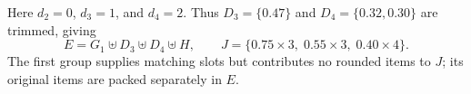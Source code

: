 Here $d_2=0$, $d_3=1$, and $d_4=2$. Thus
$D_3=\{0.47\}$ and $D_4=\{0.32,0.30\}$ are trimmed, giving
\[
    E=G_1\uplus D_3\uplus D_4\uplus H,
    \qquad
    J=\{0.75\times3,\;0.55\times3,\;0.40\times4\}.
\]
The first group supplies matching slots but contributes no rounded
items to $J$; its original items are packed separately in $E$.

